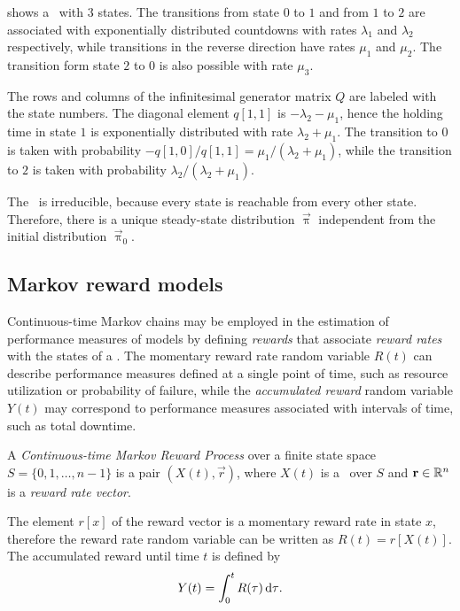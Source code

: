 \begin{example}
   shows a \CTMC\ with $3$
  states. The transitions from state $0$ to $1$ and from $1$ to $2$
  are associated with exponentially distributed countdowns with rates
  $\lambda_1$ and $\lambda_2$ respectively, while transitions in the
  reverse direction have rates $\mu_1$ and $\mu_2$. The transition
  form state $2$ to $0$ is also possible with rate $\mu_3$.
  
  The rows  and
  columns  of the infinitesimal generator
  matrix $Q$ are labeled with the state numbers. The diagonal element
  $q[1, 1]$ is $-\lambda_2 - \mu_1$, hence the holding time in state
  $1$ is exponentially distributed with rate $\lambda_2 + \mu_1$. The
  transition to $0$ is taken with probability
  $-q[1, 0] / q[1, 1] = \mu_1 / (\lambda_2 + \mu_1)$, while the
  transition to $2$ is taken with probability
  $\lambda_2 / (\lambda_2 + \mu_1)$.

  The \CTMC\ is irreducible, because every state is reachable from
  every other state. Therefore, there is a unique steady-state
  distribution $\vec{\uppi}$ independent from the initial distribution
  $\vec{\uppi}_0$.
\end{example}

\subsection{Markov reward models}

Continuous-time Markov chains may be employed in the estimation of
performance measures of models by defining \emph{rewards} that
associate \emph{reward rates} with the states of a \CTMC. The
momentary reward rate random variable $R(t)$ can describe performance
measures defined at a single point of time, such as resource
utilization or probability of failure, while the \emph{accumulated
  reward} random variable $Y(t)$ may correspond to performance
measures associated with intervals of time, such as total downtime.

\begin{dfn}
  A \emph{Continuous-time Markov Reward Process} over a finite state
  space $S = \{0, 1, \ldots, n - 1\}$ is a pair $(X(t), \vec{r})$,
  where $X(t)$ is a \CTMC\ over $S$ and $\bm{\mathrm{r}} \in \mathbb{R}^n$ is a
  \emph{reward rate vector}.
\end{dfn}

The element $r[x]$ of the reward vector is a momentary reward rate in
state $x$, therefore the reward rate random variable can be written as
$R(t) = r[X(t)]$. The accumulated reward until time $t$ is defined by
\begin{equation}
  Y(t) = \int_{0}^t R(\tau) \, \mathrm{d} \tau \text.
\end{equation}

